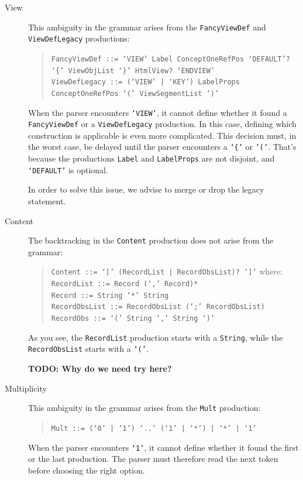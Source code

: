 \begin{description}
  \item[View]
    This ambiguity in the grammar arises from the \texttt{FancyViewDef} and \texttt{ViewDefLegacy} productions:
    \begin{quote}
        \texttt{FancyViewDef ::= `VIEW' Label ConceptOneRefPos `DEFAULT'? `\{' ViewObjList `\}' HtmlView? `ENDVIEW'}\\
        \texttt{ViewDefLegacy ::= (`VIEW' | `KEY') LabelProps ConceptOneRefPos `(' ViewSegmentList `)' }
    \end{quote}
    When the parser encounters \texttt{`VIEW'}, it cannot define whether it found a \texttt{FancyViewDef} or a \texttt{ViewDefLegacy} production.
    In this case, defining which construction is applicable is even more complicated.
    This decision must, in the worst case, be delayed until the parser encounters a \texttt{`\{'} or \texttt{'('}.
    That's because the productions \texttt{Label} and \texttt{LabelProps} are not disjoint, and \texttt{`DEFAULT'} is optional.
    
    In order to solve this issue, we advise to merge or drop the legacy statement.
    
  \item[Content]
    The backtracking in the \texttt{Content} production does not arise from the grammar:
    \begin{quote}
      \texttt{Content ::= `[' (RecordList | RecordObsList)? `]'} where:\\
      \texttt{RecordList ::= Record (`,' Record)*}\\
      \texttt{Record ::= String `*' String}\\
      \texttt{RecordObsList ::= RecordObsList (`;' RecordObsList)}\\
      \texttt{RecordObs ::= `(' String `,' String `)'}
    \end{quote}
    
    As you see, the \texttt{RecordList} production starts with a \texttt{String}, while the \texttt{RecordObsList} starts with a \texttt{`('}.
    
    \textbf{TODO: Why do we need try here?}
    
  \item[Multiplicity]
    This ambiguity in the grammar arises from the \texttt{Mult} production:
    \begin{quote}
        \texttt{Mult ::= (`0' | `1') `..' (`1' | `*') | `*' | `1'}
    \end{quote}
    When the parser encounters \texttt{`1'}, it cannot define whether it found the first or the last production.
    The parser must therefore read the next token before choosing the right option.
    

\end{description}
